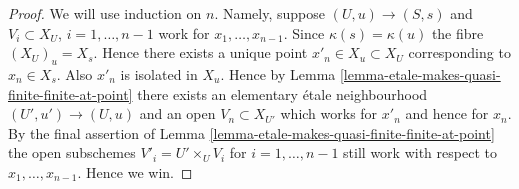 \documentclass[10pt,a4paper]{amsart}
\theoremstyle{plain}
\theoremstyle{definition}
\theoremstyle{remark}
\numberwithin{equation}{subsection}
\begin{document}
\begin{proof}
We will use induction on $n$.
Namely, suppose $(U, u) \to (S, s)$ and $V_i \subset X_U$,
$i = 1, \ldots, n - 1$ work for $x_1, \ldots, x_{n - 1}$. Since
$\kappa(s) = \kappa(u)$ the fibre $(X_U)_u = X_s$. Hence there
exists a unique point $x'_n \in X_u \subset X_U$ corresponding to
$x_n \in X_s$. Also $x'_n$ is isolated in $X_u$. Hence by
Lemma \ref{lemma-etale-makes-quasi-finite-finite-at-point} there
exists an elementary \'etale neighbourhood $(U', u') \to (U, u)$
and an open $V_n \subset X_{U'}$ which works for $x'_n$ and hence
for $x_n$.
By the final assertion of
Lemma \ref{lemma-etale-makes-quasi-finite-finite-at-point}
the open subschemes $V'_i = U'\times_U V_i$ for $i = 1, \ldots, n - 1$ still
work with respect to $x_1, \ldots, x_{n - 1}$. Hence we win.
\end{proof}
\end{document}
